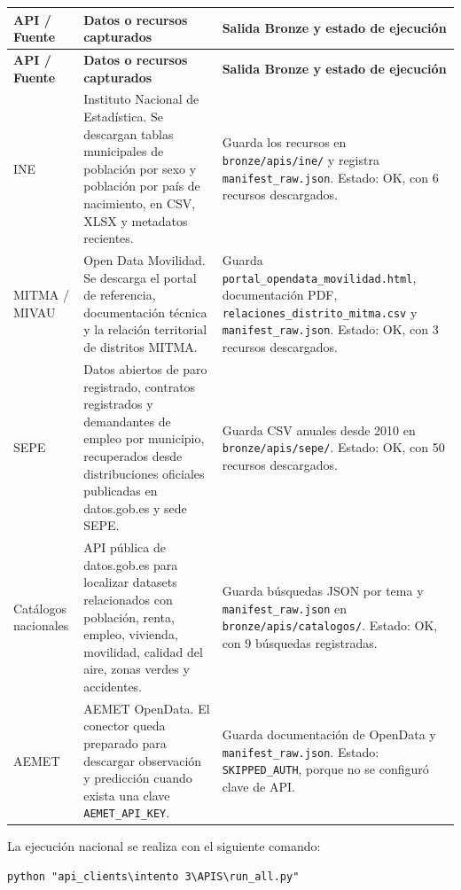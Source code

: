 \begin{longtable}{>{\raggedright\arraybackslash}p{} >{\raggedright\arraybackslash}p{} >{\raggedright\arraybackslash}p{}}
\toprule
\textbf{API / Fuente} & \textbf{Datos o recursos capturados} & \textbf{Salida Bronze y estado de ejecución} \\
\midrule
\endfirsthead
\toprule
\textbf{API / Fuente} & \textbf{Datos o recursos capturados} & \textbf{Salida Bronze y estado de ejecución} \\
\midrule
\endhead
INE & Instituto Nacional de Estadística. Se descargan tablas municipales de población por sexo y población por país de nacimiento, en CSV, XLSX y metadatos recientes. & Guarda los recursos en \texttt{bronze/apis/ine/} y registra \texttt{manifest\_raw.json}. Estado: OK, con 6 recursos descargados. \\
MITMA / MIVAU & Open Data Movilidad. Se descarga el portal de referencia, documentación técnica y la relación territorial de distritos MITMA. & Guarda \texttt{portal\_opendata\_movilidad.html}, documentación PDF, \texttt{relaciones\_distrito\_mitma.csv} y \texttt{manifest\_raw.json}. Estado: OK, con 3 recursos descargados. \\
SEPE & Datos abiertos de paro registrado, contratos registrados y demandantes de empleo por municipio, recuperados desde distribuciones oficiales publicadas en datos.gob.es y sede SEPE. & Guarda CSV anuales desde 2010 en \texttt{bronze/apis/sepe/}. Estado: OK, con 50 recursos descargados. \\
Catálogos nacionales & API pública de datos.gob.es para localizar datasets relacionados con población, renta, empleo, vivienda, movilidad, calidad del aire, zonas verdes y accidentes. & Guarda búsquedas JSON por tema y \texttt{manifest\_raw.json} en \texttt{bronze/apis/catalogos/}. Estado: OK, con 9 búsquedas registradas. \\
AEMET & AEMET OpenData. El conector queda preparado para descargar observación y predicción cuando exista una clave \texttt{AEMET\_API\_KEY}. & Guarda documentación de OpenData y \texttt{manifest\_raw.json}. Estado: \texttt{SKIPPED\_AUTH}, porque no se configuró clave de API. \\
\bottomrule
\end{longtable}

La ejecución nacional se realiza con el siguiente comando:

\begin{verbatim}
python "api_clients\intento 3\APIS\run_all.py"
\end{verbatim}

